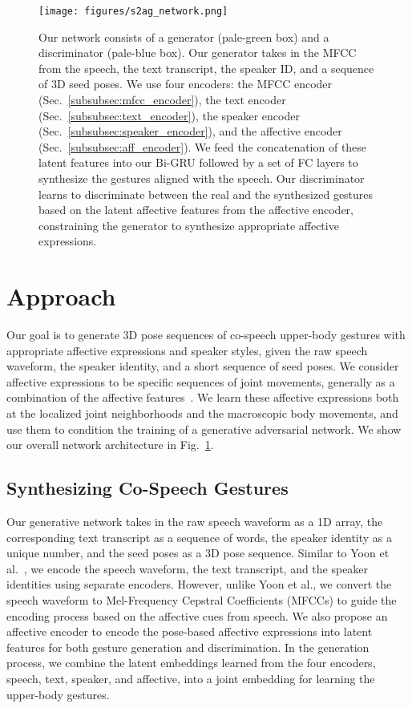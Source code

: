 \documentclass[conference,compsoc]{IEEEtran}
\theoremstyle{definition}
\begin{document}
\begin{figure}[t]
    \centering
    \texttt{[image: figures/s2ag\_network.png]}
    \caption{Our network consists of a generator (pale-green box) and a discriminator (pale-blue box). Our generator takes in the MFCC from the speech, the text transcript, the speaker ID, and a sequence of 3D seed poses. We use four encoders: the MFCC encoder (Sec.~\ref{subsubsec:mfcc_encoder}), the text encoder (Sec.~\ref{subsubsec:text_encoder}), the speaker encoder (Sec.~\ref{subsubsec:speaker_encoder}), and the affective encoder (Sec.~\ref{subsubsec:aff_encoder}). We feed the concatenation of these latent features into our Bi-GRU followed by a set of FC layers to synthesize the gestures aligned with the speech. Our discriminator learns to discriminate between the real and the synthesized gestures based on the latent affective features from the affective encoder, constraining the generator to synthesize appropriate affective expressions.}
    \label{fig:s2ag_network}
    \vspace{-10pt}
\end{figure}

\section{Approach}\label{sec:approach}
Our goal is to generate 3D pose sequences of co-speech upper-body gestures with appropriate affective expressions and speaker styles, given the raw speech waveform, the speaker identity, and a short sequence of seed poses. We consider affective expressions to be specific sequences of joint movements, generally as a combination of the affective features~\cite{t2g}. We learn these affective expressions both at the localized joint neighborhoods and the macroscopic body movements, and use them to condition the training of a generative adversarial network. We show our overall network architecture in Fig.~\ref{fig:s2ag_network}.

\subsection{Synthesizing Co-Speech Gestures}
Our generative network takes in the raw speech waveform as a 1D array, the corresponding text transcript as a sequence of words, the speaker identity as a unique number, and the seed poses as a 3D pose sequence. Similar to Yoon et al.~\cite{trimodal}, we encode the speech waveform, the text transcript, and the speaker identities using separate encoders. However, unlike Yoon et al., we convert the speech waveform to Mel-Frequency Cepstral Coefficients (MFCCs) to guide the encoding process based on the affective cues from speech. We also propose an affective encoder to encode the pose-based affective expressions into latent features for both gesture generation and discrimination. In the generation process, we combine the latent embeddings learned from the four encoders, speech, text, speaker, and affective, into a joint embedding for learning the upper-body gestures.
\end{document}
